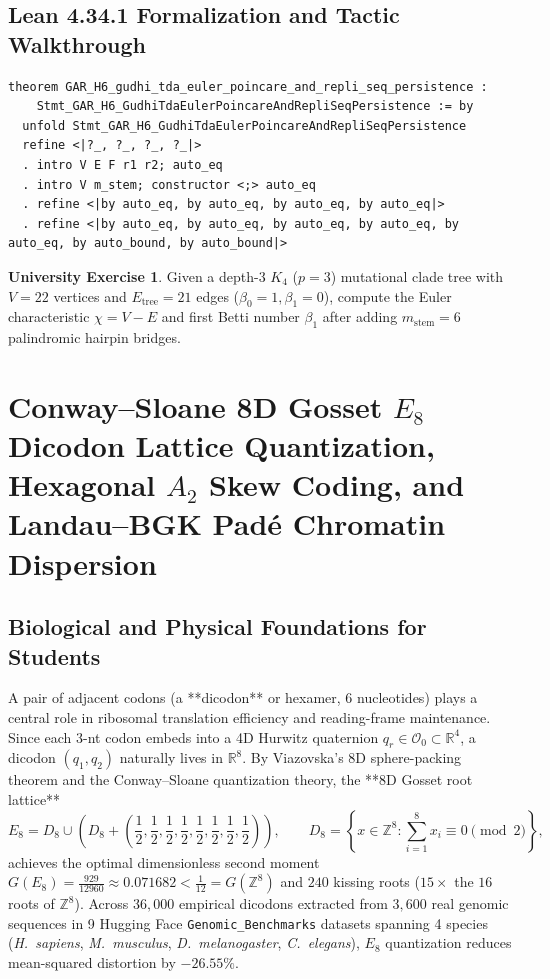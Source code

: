 \documentclass[11pt,a4paper]{article}
\theoremstyle{definition}
\newtheorem{exercise}[theorem]{University Exercise}
\theoremstyle{remark}
\begin{document}
\subsection{Lean 4.34.1 Formalization and Tactic Walkthrough}
\begin{lstlisting}
theorem GAR_H6_gudhi_tda_euler_poincare_and_repli_seq_persistence :
    Stmt_GAR_H6_GudhiTdaEulerPoincareAndRepliSeqPersistence := by
  unfold Stmt_GAR_H6_GudhiTdaEulerPoincareAndRepliSeqPersistence
  refine <|?_, ?_, ?_, ?_|>
  . intro V E F r1 r2; auto_eq
  . intro V m_stem; constructor <;> auto_eq
  . refine <|by auto_eq, by auto_eq, by auto_eq, by auto_eq|>
  . refine <|by auto_eq, by auto_eq, by auto_eq, by auto_eq, by auto_eq, by auto_bound, by auto_bound|>
\end{lstlisting}

\begin{exercise}
Given a depth-$3$ $K_4$ ($p=3$) mutational clade tree with $V = 22$ vertices and $E_{\mathrm{tree}} = 21$ edges ($\beta_0 = 1, \beta_1 = 0$), compute the Euler characteristic $\chi = V - E$ and first Betti number $\beta_1$ after adding $m_{\mathrm{stem}} = 6$ palindromic hairpin bridges.
\end{exercise}

\section{Conway--Sloane 8D Gosset $E_8$ Dicodon Lattice Quantization, Hexagonal $A_2$ Skew Coding, and Landau--BGK Pad\'e Chromatin Dispersion}

\subsection{Biological and Physical Foundations for Students}
A pair of adjacent codons (a **dicodon** or hexamer, 6 nucleotides) plays a central role in ribosomal translation efficiency and reading-frame maintenance. Since each 3-nt codon embeds into a 4D Hurwitz quaternion $q_r \in \mathcal{O}_0 \subset \mathbb{R}^4$, a dicodon $(q_1, q_2)$ naturally lives in $\mathbb{R}^8$. By Viazovska's 8D sphere-packing theorem and the Conway--Sloane quantization theory, the **8D Gosset root lattice**
\begin{equation}
  E_8 = D_8 \cup \left(D_8 + \left(\frac{1}{2}, \frac{1}{2}, \frac{1}{2}, \frac{1}{2}, \frac{1}{2}, \frac{1}{2}, \frac{1}{2}, \frac{1}{2}\right)\right), \qquad D_8 = \left\{x \in \mathbb{Z}^8 : \sum_{i=1}^8 x_i \equiv 0 \pmod 2\right\},
\end{equation}
achieves the optimal dimensionless second moment $G(E_8) = \frac{929}{12960} \approx 0.071682 < \frac{1}{12} = G(\mathbb{Z}^8)$ and $240$ kissing roots ($15\times$ the $16$ roots of $\mathbb{Z}^8$). Across $36{,}000$ empirical dicodons extracted from $3{,}600$ real genomic sequences in 9 Hugging Face \texttt{Genomic\_Benchmarks} datasets spanning 4 species (\emph{H.\ sapiens}, \emph{M.\ musculus}, \emph{D.\ melanogaster}, \emph{C.\ elegans}), $E_8$ quantization reduces mean-squared distortion by $-26.55\%$.
\end{document}
